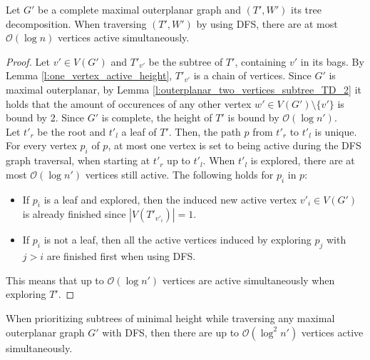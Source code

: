 \begin{lemma}\label{l:complete_maximal_outerplanar_log_n_active}
	Let $G'$ be a complete maximal outerplanar graph and $(T',W')$ its tree decomposition. When traversing $(T',W')$ by using DFS, there are at most $\mathcal{O}(\log n)$ vertices active simultaneously.
\end{lemma}
\begin{proof}
	Let $v' \in V(G')$ and $T'_{v'}$ be the subtree of $T'$, containing $v'$ in its bags. By Lemma \ref{l:one_vertex_active_height}, $T'_{v'}$ is a chain of vertices. Since $G'$ is maximal outerplanar, by Lemma \ref{l:outerplanar_two_vertices_subtree_TD_2} it holds that the amount of occurences of any other vertex $w'\in V(G')\setminus\{v'\}$ is bound by 2. Since $G'$ is complete, the height of $T'$ is bound by $\mathcal{O}(\log n')$.\\
	Let $t'_r$ be the root and $t'_l$ a leaf of $T'$. Then, the path $p$ from $t'_r$ to $t'_l$ is unique. For every vertex $p_i$ of $p$, at most one vertex is set to being active during the DFS graph traversal, when starting at $t'_r$ up to $t'_l$. When $t'_l$ is explored, there are at most $\mathcal{O}(\log n')$ vertices still active. 
	The following holds for $p_i$ in $p$:
	\begin{itemize}
		\item If $p_i$ is a leaf and explored, then the induced new active vertex $v'_i\in V(G')$ is already finished since $|V(T'_{v'_i})| = 1$.
		\item If $p_i$ is not a leaf, then all the active vertices induced by exploring $p_{j}$ with $j>i$ are finished first when using DFS.
	\end{itemize}
	This means that up to $\mathcal{O}(\log n')$ vertices are active simultaneously when exploring $T'$.
\end{proof}

\begin{lemma}
	When prioritizing subtrees of minimal height while traversing any maximal outerplanar graph $G'$ with DFS, then there are up to $\mathcal{O}(\log^2 n')$ vertices active simultaneously.
\end{lemma}

